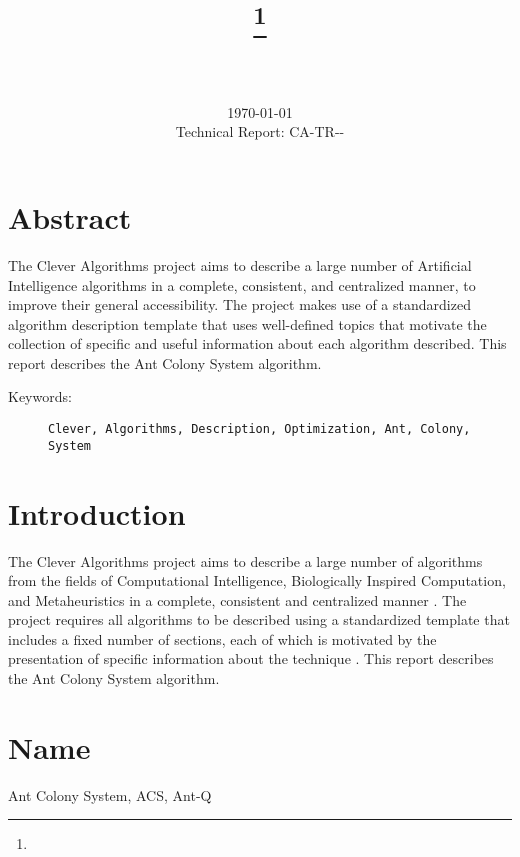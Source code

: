 \documentclass[a4paper, 11pt]{article}
\title{{\myreporttitle}\footnote{\myreportlicense}}
\author{\myreportauthor\\{\myreportemail}\\\small\myreportproject}
\date{\today\\{\small{Technical Report: CA-TR-{\myreportdate}-\myreportversion}}}
\begin{document}
\maketitle

\section*{Abstract} 
The Clever Algorithms project aims to describe a large number of Artificial Intelligence algorithms in a complete, consistent, and centralized manner, to improve their general accessibility. 
The project makes use of a standardized algorithm description template that uses well-defined topics that motivate the collection of specific and useful information about each algorithm described.
This report describes the Ant Colony System algorithm.

\begin{description}
	\item[Keywords:] {\small\texttt{Clever, Algorithms, Description, Optimization, Ant, Colony, System}}
\end{description} 

\section{Introduction} 
\label{sec:intro}
The Clever Algorithms project aims to describe a large number of algorithms from the fields of Computational Intelligence, Biologically Inspired Computation, and Metaheuristics in a complete, consistent and centralized manner \cite{Brownlee2010}.
The project requires all algorithms to be described using a standardized template that includes a fixed number of sections, each of which is motivated by the presentation of specific information about the technique \cite{Brownlee2010a}.
This report describes the Ant Colony System algorithm.

\section{Name} 
\label{sec:name}
Ant Colony System, ACS, Ant-Q
\end{document}
